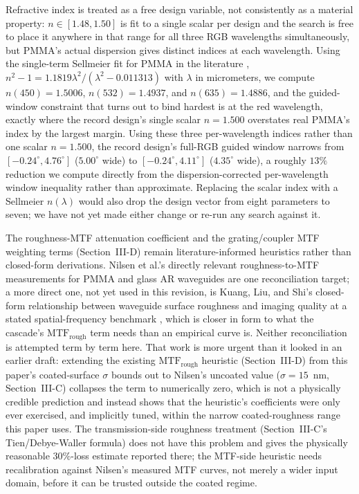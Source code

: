 \documentclass[10pt,twocolumn]{article}
\begin{document}
Refractive index is treated as a free design variable, not consistently as
a material property: $n\in[1.48,1.50]$ is fit to a single scalar per
design and the search is free to place it anywhere in that range for all
three RGB wavelengths simultaneously, but PMMA's actual dispersion gives
distinct indices at each wavelength. Using the single-term Sellmeier fit
for PMMA in the literature \cite{sultanova2009}, $n^2-1 =
1.1819\lambda^2/(\lambda^2-0.011313)$ with $\lambda$ in micrometers, we
compute $n(450)=1.5006$, $n(532)=1.4937$, and $n(635)=1.4886$, and the
guided-window constraint that turns out to bind hardest is at the red
wavelength, exactly where the record design's single scalar $n=1.500$
overstates real PMMA's index by the largest margin. Using these three
per-wavelength indices rather than one scalar $n=1.500$, the record
design's full-RGB guided window narrows from $[-0.24^\circ,4.76^\circ]$
($5.00^\circ$ wide) to $[-0.24^\circ,4.11^\circ]$ ($4.35^\circ$ wide), a
roughly $13\%$ reduction we compute directly from the dispersion-corrected
per-wavelength window inequality rather than approximate. Replacing the
scalar index with a Sellmeier $n(\lambda)$ would also drop the design
vector from eight parameters to seven; we have not yet made either change
or re-run any search against it.

The roughness-MTF attenuation coefficient and the grating/coupler MTF
weighting terms (Section~III-D) remain literature-informed heuristics
rather than closed-form derivations. Nilsen et al.'s directly relevant
roughness-to-MTF measurements for PMMA and glass AR waveguides
\cite{nilsen2025} are one reconciliation target; a more direct one, not yet
used in this revision, is Kuang, Liu, and Shi's closed-form relationship
between waveguide surface roughness and imaging quality at a stated
spatial-frequency benchmark \cite{kuang2020}, which is closer in form to
what the cascade's $\mathrm{MTF}_{\mathrm{rough}}$ term needs than an
empirical curve is. Neither reconciliation is attempted
term by term here. That work is more urgent than it looked in an
earlier draft: extending the existing $\mathrm{MTF}_{\mathrm{rough}}$
heuristic (Section~III-D) from this paper's coated-surface $\sigma$ bounds
out to Nilsen's uncoated value ($\sigma=15$~nm, Section~III-C) collapses
the term to numerically zero, which is not a physically credible
prediction and instead shows that the heuristic's coefficients were only
ever exercised, and implicitly tuned, within the narrow coated-roughness
range this paper uses. The transmission-side roughness treatment
(Section~III-C's Tien/Debye-Waller formula) does not have this problem and
gives the physically reasonable $30\%$-loss estimate reported there; the
MTF-side heuristic needs recalibration against Nilsen's measured MTF
curves, not merely a wider input domain, before it can be trusted outside
the coated regime.
\end{document}

